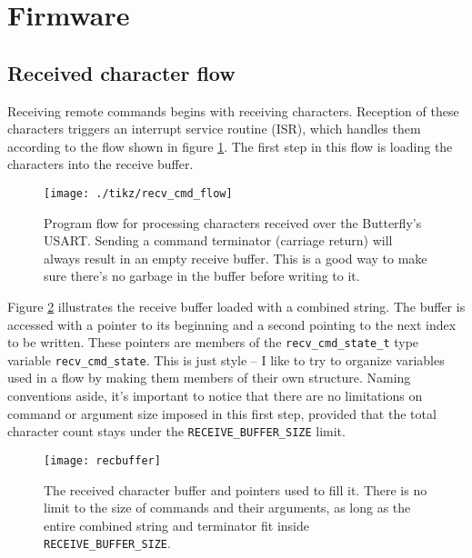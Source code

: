 \section{Firmware}


\subsection{Received character flow}

Receiving remote commands begins with receiving characters. Reception
of these characters triggers an interrupt service routine (ISR), which
handles them according to the flow shown in figure
\ref{fig:recflow}. The first step in this flow is loading the
characters into the receive buffer.

\begin{figure}[ht]
  \begin{center}
    \texttt{[image: ./tikz/recv\_cmd\_flow]}
    \caption{Program flow for processing characters received over the
      Butterfly's USART.  Sending a command terminator (carriage
      return) will always result in an empty receive buffer.  This is
      a good way to make sure there's no garbage in the buffer before
      writing to it.\label{fig:recflow}}
  \end{center}
\end{figure}

Figure \ref{fig:recbuffer} illustrates the receive buffer loaded with
a combined string.  The buffer is accessed with a pointer to its
beginning and a second pointing to the next index to be written.
These pointers are members of the \texttt{recv\_cmd\_state\_t} type
variable \texttt{recv\_cmd\_state}.  This is just style -- I like to
try to organize variables used in a flow by making them members of
their own structure.  Naming conventions aside, it's important to
notice that there are no limitations on command or argument size
imposed in this first step, provided that the total character count
stays under the \texttt{RECEIVE\_BUFFER\_SIZE} limit.
 
\begin{figure}[ht]
  \begin{center}
    \texttt{[image: recbuffer]}
    \caption{The received character buffer and pointers used to fill
      it.  There is no limit to the size of commands and their
      arguments, as long as the entire combined string and terminator
      fit inside \texttt{RECEIVE\_BUFFER\_SIZE}.\label{fig:recbuffer}}
  \end{center}
\end{figure}



